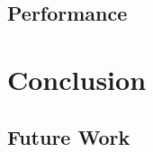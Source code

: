 \documentclass[bsc,logo,frontabs,twoside,singlespacing,normalheadings,parskip]{infthesis}     %
\begin{document}
\section{Performance}




\chapter{Conclusion}

\section{Future Work}




\end{document}
